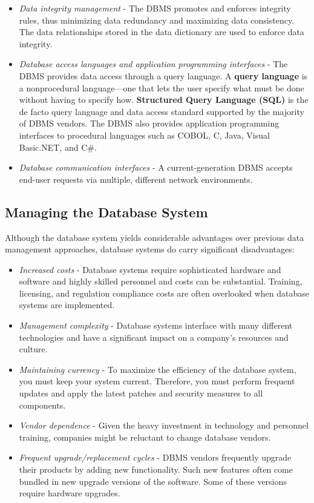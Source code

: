 \documentclass[a4paper, 12pt, titlepage]{report}
\begin{document}
\begin{itemize}
\item \emph{Data integrity management} - The DBMS promotes and enforces integrity rules, thus minimizing data redundancy and maximizing data consistency. The data relationships stored in the data dictionary are used to enforce data integrity.
\item \emph{Database access languages and application programming interfaces} - The DBMS provides data access through a query language. A \textbf{query language} is a nonprocedural language—one that lets the user specify what must be done without having to specify how. \textbf{Structured Query Language (SQL)} is the de facto query language and data access standard supported by the majority of DBMS vendors. The DBMS also provides application programming interfaces to procedural languages such as COBOL, C, Java, Visual Basic.NET, and C\#.
\item \emph{Database communication interfaces} - A current-generation DBMS accepts end-user requests via multiple, different network environments.
\end{itemize}
\subsection{Managing the Database System}
Although the database system yields considerable advantages over previous data management approaches, database systems do carry significant disadvantages:
\begin{itemize}
\item \emph{Increased costs} - Database systems require sophisticated hardware and software and highly skilled personnel and costs can be substantial. Training, licensing, and regulation compliance costs are often overlooked when database systems are implemented.
\item \emph{Management complexity} - Database systems interface with many different technologies and have a significant impact on a company’s resources and culture.
\item \emph{Maintaining currency} - To maximize the efficiency of the database system, you must keep your system current. Therefore, you must perform frequent updates and apply
the latest patches and security measures to all components.
\item \emph{Vendor dependence} - Given the heavy investment in technology and personnel training, companies might be reluctant to change database vendors.
\item \emph{Frequent upgrade/replacement cycles} - DBMS vendors frequently upgrade their products by adding new functionality. Such new features often come bundled in new upgrade versions of the software. Some of these versions require hardware upgrades.
\end{itemize}
\end{document}
